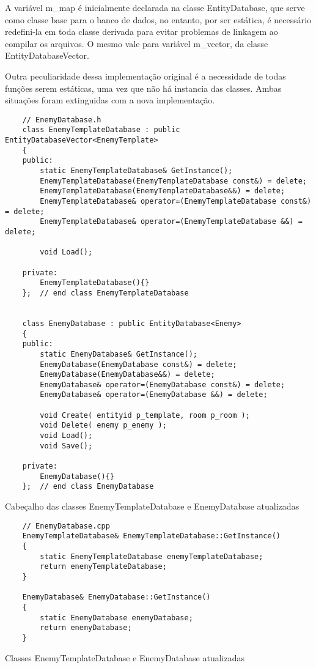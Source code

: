 A variável m\_map é inicialmente declarada na classe EntityDatabase, que serve como classe base para
o banco de dados, no entanto, por ser estática, é necessário redefini-la em toda classe derivada para 
evitar problemas de linkagem ao compilar os arquivos. O mesmo vale para variável m\_vector, da classe EntityDatabaseVector.

Outra peculiaridade dessa implementação original é a necessidade de todas funções serem estáticas, uma vez que 
não há instancia das classes. Ambas situações foram extinguidas com a nova implementação.

\begin{listing}[!ht]
    \begin{verbatim}
    // EnemyDatabase.h
    class EnemyTemplateDatabase : public EntityDatabaseVector<EnemyTemplate>
    {
    public:
        static EnemyTemplateDatabase& GetInstance();
        EnemyTemplateDatabase(EnemyTemplateDatabase const&) = delete;
        EnemyTemplateDatabase(EnemyTemplateDatabase&&) = delete;
        EnemyTemplateDatabase& operator=(EnemyTemplateDatabase const&) = delete;
        EnemyTemplateDatabase& operator=(EnemyTemplateDatabase &&) = delete;

        void Load();

    private:
        EnemyTemplateDatabase(){}
    };  // end class EnemyTemplateDatabase


    class EnemyDatabase : public EntityDatabase<Enemy>
    {
    public:
        static EnemyDatabase& GetInstance();
        EnemyDatabase(EnemyDatabase const&) = delete;
        EnemyDatabase(EnemyDatabase&&) = delete;
        EnemyDatabase& operator=(EnemyDatabase const&) = delete;
        EnemyDatabase& operator=(EnemyDatabase &&) = delete;

        void Create( entityid p_template, room p_room );
        void Delete( enemy p_enemy );
        void Load();
        void Save();

    private:
        EnemyDatabase(){}
    };  // end class EnemyDatabase
    \end{verbatim}
\caption{Cabeçalho das classes EnemyTemplateDatabase e EnemyDatabase atualizadas}
\label{lst:enemyDatabaseHeaderUpdate}
\end{listing}

\begin{listing}[!ht]
    \begin{verbatim}
    // EnemyDatabase.cpp
    EnemyTemplateDatabase& EnemyTemplateDatabase::GetInstance()
    {
        static EnemyTemplateDatabase enemyTemplateDatabase;
        return enemyTemplateDatabase;
    }

    EnemyDatabase& EnemyDatabase::GetInstance()
    {
        static EnemyDatabase enemyDatabase;
        return enemyDatabase;
    }
    \end{verbatim}
\caption{Classes EnemyTemplateDatabase e EnemyDatabase atualizadas}
\label{lst:enemyDatabaseUpdate}
\end{listing}

